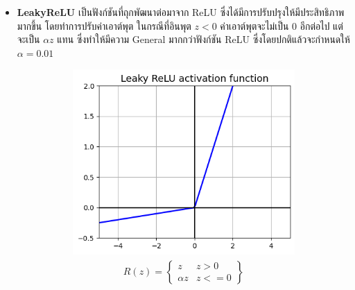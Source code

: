 \begin{itemize}
    \item \textbf{LeakyReLU}\autocite{he2015} เป็นฟังก์ชันที่ถุกพัฒนาต่อมาจาก ReLU ซึ่งได้มีการปรับปรุงให้มีประสิทธิภาพมากขึ้น%
    โดยทำการปรับค่าเอาต์พุต ในกรณีที่อินพุต $z < 0$ ค่าเอาต์พุตจะไม่เป็น 0 อีกต่อไป แต่จะเป็น $\alpha z$ แทน ซึ่งทำให้มีความ General 
    มากกว่าฟังก์ชัน ReLU ซึ่งโดยปกติแล้วจะกำหนดให้ $\alpha = 0.01$
    \begin{figure}[H]
        \centering
        \begin{subfigure}{0.5\textwidth}
            \centering
            \includegraphics[width=0.9\linewidth]{fig/actfunc_leakyrelu.png}
            \caption{%
                \begin{equation}
                    \begin{split}R(z) = \begin{Bmatrix} z & z > 0 \\
                        \alpha z & z <= 0 \end{Bmatrix}\end{split}
                \end{equation}
            }
            \label{fig:actfunc_leakyrelu}
        \end{subfigure}%
        \begin{subfigure}{0.5\textwidth}
            \centering

\end{subfigure}
\end{figure}
\end{itemize}
